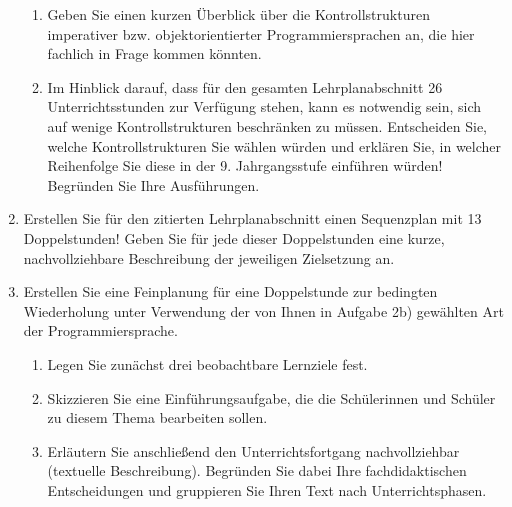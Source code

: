\documentclass{bschlangaul-aufgabe}
\begin{document}
\begin{enumerate}
\begin{enumerate}

\item Geben Sie einen kurzen Überblick über die Kontrollstrukturen
imperativer bzw. objektorientierter Programmiersprachen an, die hier
fachlich in Frage kommen könnten.


\item Im Hinblick darauf, dass für den gesamten Lehrplanabschnitt 26
Unterrichtsstunden zur Verfügung stehen, kann es notwendig sein, sich
auf wenige Kontrollstrukturen beschränken zu müssen. Entscheiden Sie,
welche Kontrollstrukturen Sie wählen würden und erklären Sie, in welcher
Reihenfolge Sie diese in der 9. Jahrgangsstufe einführen würden!
Begründen Sie Ihre Ausführungen.

\end{enumerate}


\item Erstellen Sie für den zitierten Lehrplanabschnitt einen
Sequenzplan mit 13 Doppelstunden! Geben Sie für jede dieser
Doppelstunden eine kurze, nachvollziehbare Beschreibung der jeweiligen
Zielsetzung an.


\item Erstellen Sie eine Feinplanung für eine Doppelstunde zur bedingten
Wiederholung unter Verwendung der von Ihnen in Aufgabe 2b) gewählten Art
der Programmiersprache.
\begin{enumerate}

\item Legen Sie zunächst drei beobachtbare Lernziele fest.


\item Skizzieren Sie eine Einführungsaufgabe, die die Schülerinnen und
Schüler zu diesem Thema bearbeiten sollen.


\item Erläutern Sie anschließend den Unterrichtsfortgang nachvollziehbar
(textuelle Beschreibung). Begründen Sie dabei Ihre fachdidaktischen
Entscheidungen und gruppieren Sie Ihren Text nach Unterrichtsphasen.

\end{enumerate}
\end{enumerate}
\end{document}
